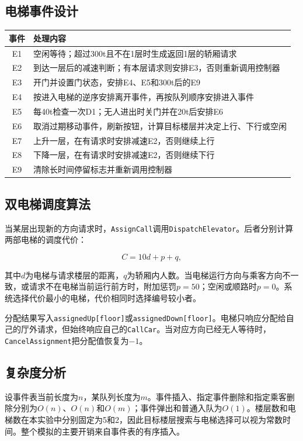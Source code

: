 \documentclass[UTF8,a4paper,12pt]{ctexart}
\begin{document}
\subsection{电梯事件设计}

\begin{longtable}{cp{11cm}}
\toprule
事件 & 处理内容\\
\midrule
E1 & 空闲等待；超过300t且不在1层时生成返回1层的轿厢请求\\
E2 & 到达一层后的减速判断；有本层请求则安排E3，否则重新调用控制器\\
E3 & 开门并设置门状态，安排E4、E5和300t后的E9\\
E4 & 按进入电梯的逆序安排离开事件，再按队列顺序安排进入事件\\
E5 & 每40t检查一次D1；无人进出时关门并在20t后安排E6\\
E6 & 取消过期移动事件，刷新按钮，计算目标楼层并决定上行、下行或空闲\\
E7 & 上升一层，在有请求时安排减速E2，否则继续上行\\
E8 & 下降一层，在有请求时安排减速E2，否则继续下行\\
E9 & 清除长时间停留标志并重新调用控制器\\
\bottomrule
\end{longtable}

\subsection{双电梯调度算法}

当某层出现新的方向请求时，\texttt{AssignCall}调用\texttt{DispatchElevator}。后者分别计算两部电梯的调度代价：

\[
C=10d+p+q,
\]

其中$d$为电梯与请求楼层的距离，$q$为轿厢内人数。当电梯运行方向与乘客方向不一致，或请求不在电梯当前运行前方时，附加惩罚$p=50$；空闲或顺路时$p=0$。系统选择代价最小的电梯，代价相同时选择编号较小者。

分配结果写入\texttt{assignedUp[floor]}或\texttt{assignedDown[floor]}。电梯只响应分配给自己的厅外请求，但始终响应自己的\texttt{CallCar}。当对应方向已经无人等待时，\texttt{CancelAssignment}把分配值恢复为$-1$。

\subsection{复杂度分析}

设事件表当前长度为$n$，某队列长度为$m$。事件插入、指定事件删除和指定乘客删除分别为$O(n)$、$O(n)$和$O(m)$；事件弹出和普通入队为$O(1)$。楼层数和电梯数在本实验中分别固定为5和2，因此目标楼层搜索与电梯选择可以视为常数时间。整个模拟的主要开销来自事件表的有序插入。
\end{document}
